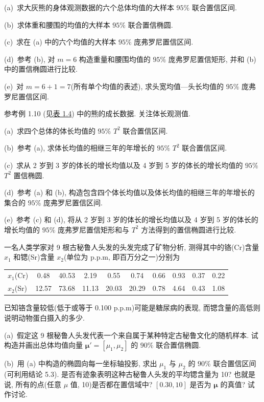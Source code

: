 (a)\ 求大灰熊的身体观测数据的六个总体均值的大样本 $95\%$ 联合置信区间.

(b)\ 求体重和腰围的均值的大样本 $95\%$ 联合置信椭圆.

(c)\ 求在 (a) 中的六个均值的大样本 $95\%$ 庞弗罗尼置信区间.

(d)\ 参考 (b), 对 $m=6$ 构造重量和腰围均值的 $95\%$ 庞弗罗尼置信矩形, 并和 (b) 中的置信椭圆进行比较.

(e)\ 对 $m=6+1=7$(所有单个均值的表述), 求头宽均值—头长均值的 $95\%$ 庞弗罗尼置信区间.

\quad 参考例 1.10 (见\hyperref[tab:1.4]{表 1.4}) 中的熊的成长数据. 关注体长观测值.

(a)\ 求四个总体的体长均值的 $95\%$ $T^2$ 联合置信区间.

(b)\ 参考 (a), 求体长均值的相继三年的年增长的 $95\%$ $T^2$ 联合置信区间.

(c)\ 求从 2 岁到 3 岁的体长的增长均值以及 4 岁到 5 岁的体长的增长均值的 $95\%$ $T^2$ 置信椭圆.

(d)\ 参考 (a) 和 (b), 构造包含四个体长均值以及体长均值的相继三年的年增长的集合的 $95\%$ 庞弗罗尼置信区间.

(e)\ 参考 (c) 和 (d), 将从 2 岁到 3 岁的体长的增长均值以及 4 岁到 5 岁的体长的增长均值的 $95\%$ 庞弗罗尼置信矩形和与 $T^2$ 方法得到的置信椭圆进行比较.

\quad 一名人类学家对 9 根古秘鲁人头发的头发完成了矿物分析, 测得其中的铬(Cr)含量 $x_1$ 和锶(Sr)含量 $x_2$(单位为 p.p.m, 即百万分之一)分别为

\begin{center}
\begin{tabular}{lccccccccc}
\toprule
$x_1$(Cr) & 0.48 & 40.53 & 2.19 & 0.55 & 0.74 & 0.66 & 0.93 & 0.37 & 0.22\\
$x_2$(Sr) & 12.57 & 73.68 & 11.13 & 20.03 & 20.29 & 0.78 & 4.64 & 0.43 & 1.08\\
\bottomrule
\end{tabular}
\end{center}

已知铬含量较低(低于或等于 0.100 p.p.m)可能是糖尿病的表现, 而锶含量的高低则说明动物蛋白摄入的多少.

(a)\ 假定这 9 根秘鲁人头发代表一个来自属于某种特定古秘鲁文化的随机样本. 试构造并画出总体均值向量 $\boldsymbol{\mu}'=[\mu_1,\mu_2]$ 的 $90\%$ 联合置信椭圆.

(b)\ 用 (a) 中构造的椭圆向每一坐标轴投影, 求出 $\mu_1$ 与 $\mu_2$ 的 $90\%$ 联合置信区间(可利用结论 5.3). 是否有迹象表明这种古秘鲁人头发的平均锶含量为 10? 也就是说, 所有的点(任意 $\mu$ 值, 10)是否都在置信域中? $[0.30,10]$ 是否为 $\boldsymbol{\mu}$ 的真值? 试作讨论.

